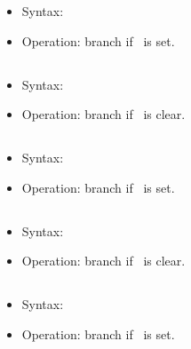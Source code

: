\begin{itemize}
\item Syntax: 
\item Operation: branch if \flagV\ is set.
\end{itemize}

\subsection{}

\begin{itemize}
\item Syntax: 
\item Operation: branch if \flagV\ is clear.
\end{itemize}

\subsection{}

\begin{itemize}
\item Syntax: 
\item Operation: branch if \flagE\ is set.
\end{itemize}

\subsection{}

\begin{itemize}
\item Syntax: 
\item Operation: branch if \flagE\ is clear.
\end{itemize}

\subsection{}

\begin{itemize}
\item Syntax: 
\item Operation: branch if \flagI\ is set.
\end{itemize}

\subsection{}

